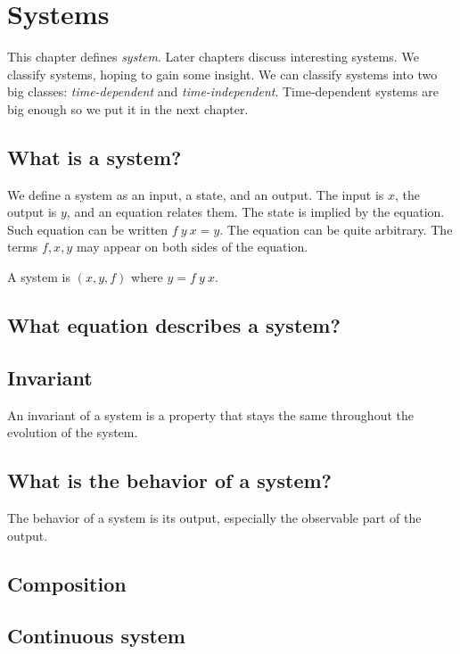 \chapter{Systems}

This chapter defines \emph{system}.
Later chapters discuss interesting systems.
We classify systems, hoping to gain some insight.
We can classify systems into two big classes:
\emph{time-dependent} and \emph{time-independent}.
Time-dependent systems are big enough
so we put it in the next chapter.

\section{What is a system?}

We define a system as an input, a state, and an output.
The input is \(x\), the output is \(y\), and an equation relates them.
The state is implied by the equation.
Such equation can be written \(f~y~x = y\).
The equation can be quite arbitrary.
The terms \(f,x,y\) may appear on both sides of the equation.

\begin{m:def}[System]
A system is \((x,y,f)\) where \(y=f~y~x\).
\end{m:def}

\section{What equation describes a system?}

\section{Invariant}

An invariant of a system is a property that stays
the same throughout the evolution of the system.

\section{What is the behavior of a system?}

The behavior of a system is its output, especially the observable part of the output.

\section{Composition}

\section{Continuous system}

